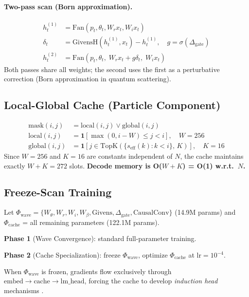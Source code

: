 \documentclass{article}
\begin{document}
\paragraph{Two-pass scan (Born approximation).}
\begin{align}
  h^{(1)}_t &= \text{Fan}(p_t, \theta_t, W_r x_t, W_i x_t) \\
  \delta_t   &= \text{GivensH}(h^{(1)}_t, x_t) - h^{(1)}_t,\quad
               g = \sigma(\Delta_\text{gate}) \\
  h^{(2)}_t &= \text{Fan}(p_t, \theta_t,\; W_r x_t + g\delta_t,\; W_i x_t)
\end{align}
Both passes share all weights; the second uses the first as
a perturbative correction (Born approximation in quantum scattering).

\subsection{Local-Global Cache (Particle Component)}

\begin{align}
  \text{mask}(i,j) &= \text{local}(i,j) \vee \text{global}(i,j) \\
  \text{local}(i,j) &= \mathbf{1}[\max(0,i{-}W) \le j < i],\quad W{=}256 \\
  \text{global}(i,j) &= \mathbf{1}[j \in \text{TopK}(
    \{s_\text{eff}(k):k<i\},\,K)],\quad K{=}16
\end{align}
Since $W{=}256$ and $K{=}16$ are constants independent of $N$,
the cache maintains exactly $W{+}K{=}272$ slots.
\textbf{Decode memory is O($W{+}K$) = O(1) w.r.t.\ $N$.}

\subsection{Freeze-Scan Training}

Let $\Phi_\text{wave} = \{W_\theta, W_r, W_i, W_\beta,
\text{Givens}, \Delta_\text{gate}, \text{CausalConv}\}$ (14.9M params) and
$\Phi_\text{cache}$ = all remaining parameters (122.1M params).

\textbf{Phase 1} (Wave Convergence): standard full-parameter training.

\textbf{Phase 2} (Cache Specialization): freeze $\Phi_\text{wave}$,
optimize $\Phi_\text{cache}$ at $\text{lr}{=}10^{-4}$.

When $\Phi_\text{wave}$ is frozen, gradients flow exclusively through
$\text{embed} \to \text{cache} \to \text{lm\_head}$,
forcing the cache to develop \emph{induction head} mechanisms
\citep{olsson2022context}.
\end{document}
